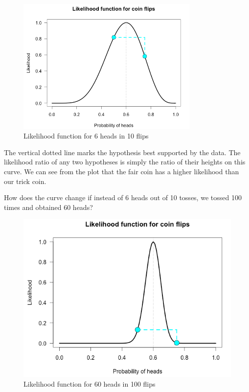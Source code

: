 \begin{figure}[h]
    \centering
\includegraphics[width=0.8\textwidth]{pic/p05c03-snip01.png}
    \caption{Likelihood function for 6 heads in 10 flips}
    \label{fig:p05c03-snip01}
\end{figure}

The vertical dotted line marks the hypothesis best supported by the data. The likelihood ratio of any two hypotheses is simply the ratio of their heights on this curve. We can see from the plot that the fair coin has a higher likelihood than our trick coin.

How does the curve change if instead of 6 heads out of 10 tosses, we tossed 100 times and obtained 60 heads?

\begin{figure}[h]
    \centering
\includegraphics[width=.8\textwidth]{pic/p05c03-snip02.png}
    \caption{Likelihood function for  60 heads in 100  flips}
    \label{fig:p05c03-snip02}
\end{figure}

